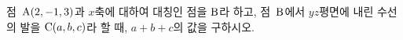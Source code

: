 점~$\mathrm{A}(2{,}\mkern3mu\mathopen{}-1{,}\mkern3mu\mathopen{}3)$과 $x$축에 대하여 대칭인 점을 $\mathrm{B}$라 하고, 점~$\mathrm{B}$에서 $yz$평면에 내린 수선의 발을 $\mathrm{C}(a{,}\mkern3mu\mathopen{}b{,}\mkern3mu\mathopen{}c)$라 할 때, $a+b+c$의 값을 구하시오.
